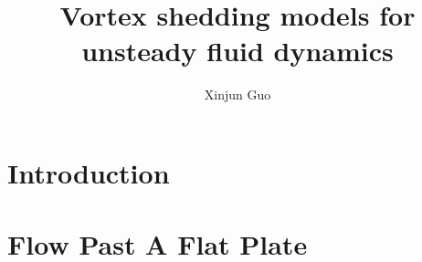 \documentclass[12pt]{report}   %
\title{
Vortex shedding models for unsteady fluid dynamics
}
\author{Xinjun Guo}
\begin{document}
\doublespacing
\begin{preliminaries}
\maketitle

\copyrightpage

\begin{signature}
\end{signature}

\begin{vita}
  
\end{vita}

\begin{acknowledgments}
  
\end{acknowledgments}

\begin{abstract}
  
  \thispagestyle{empty}
\end{abstract}

\begin{spacing}{1}
  \tableofcontents
  \clearpage{\pagestyle{empty}\cleardoublepage}

  \footnotesize
  \fontsize{11.5pt}{12.5pt}\selectfont
  \listoftables
  \clearpage{\pagestyle{empty}\cleardoublepage}

  \listoffigures
  \clearpage{\pagestyle{empty}\cleardoublepage}
  \normalsize
\end{spacing}

\end{preliminaries}

\pagestyle{myheadings}



\nocite{*}

\chapter{Introduction}

\clearpage{\pagestyle{empty}\cleardoublepage}

\chapter{Flow Past A Flat Plate}

\clearpage{\pagestyle{empty}\cleardoublepage}
\end{document}
